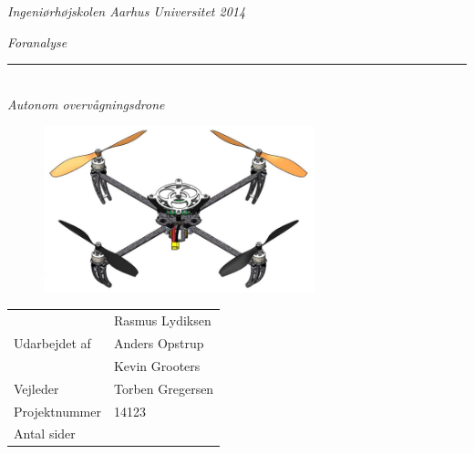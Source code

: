 \thispagestyle{empty}

\begin{center}
\textsl{Ingeniørhøjskolen Aarhus Universitet 2014 } \\ \vspace{0.5cm}

\phantom{hul}

\textsl{\HUGE Foranalyse } \\ \vspace{0cm}
\rule{15cm}{0.5mm}  \\ \vspace{0.5cm}
\textsl{\LARGE Autonom overvågningsdrone } \\ \vspace{0.5cm}

\vspace{2cm}

\begin{figure}[H]
\centering
\includegraphics[width=0.7\textwidth]{Billeder/Forsidebillede.png}
\label{fig:Forside_foranalyse}
\end{figure}

\vspace{3cm}

\begin{table}[h]
\begin{tabular}{l|l}
\hline

 						&	Rasmus Lydiksen 				\\
Udarbejdet af \hspace{5cm} &	Anders Opstrup  \hspace{3.8cm}	\\
 						&  	Kevin Grooters					\\ \hline

Vejleder				&	Torben Gregersen 				\\ \hline
Projektnummer			&	14123 			 				\\ \hline
Antal sider				&	\pageref{LastPage} 				\\ \hline
\end{tabular}
\end{table}


\end{center}
